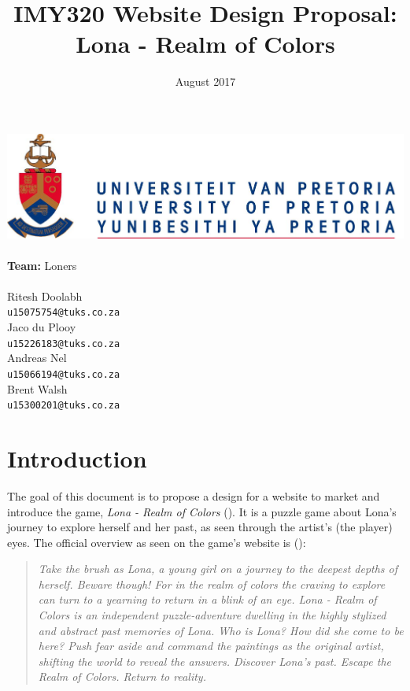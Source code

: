 \documentclass{article}
\title{IMY320 Website Design Proposal: Lona - Realm of Colors}
\date{August 2017}
\begin{document}
\makeatletter
    \begin{titlepage}
        \begin{center}
            \includegraphics[width=0.7\linewidth]{up.png}\\[4ex]
            {\huge \bfseries \@title }\\[2ex]
            {\LARGE \textbf{Team:} Loners}\\[2ex]
            {\LARGE \@date}\\[2ex]
            {\large  Ritesh Doolabh\\ \texttt{u15075754@tuks.co.za}}\\[2ex] 
            {\large  Jaco du Plooy\\ \texttt{u15226183@tuks.co.za}}\\[2ex]
            {\large  Andreas Nel\\ \texttt{u15066194@tuks.co.za}}\\[2ex] 
            {\large  Brent Walsh\\ \texttt{u15300201@tuks.co.za}}\\[2ex]
        \end{center}
        
    \end{titlepage}
\makeatother
\cleardoublepage
\thispagestyle{empty}
\newpage
\tableofcontents
\newpage
\section{Introduction}
The goal of this document is to propose a design for a website to market and introduce the game, \textit{Lona - Realm of Colors} (\cite{lonaweb}). It is a puzzle game about Lona's journey to explore herself and her past, as seen through the artist's (the player) eyes. The official overview as seen on the game's website is (\cite{lonaweb}):
    \begin{quotation}
    \textit{
    Take the brush as Lona, a young girl on a journey to the deepest depths of herself. Beware though! For in the realm of colors the craving to explore can turn to a yearning to return in a blink of an eye.
    Lona - Realm of Colors is an independent puzzle-adventure dwelling in the highly stylized and abstract past memories of Lona.
    Who is Lona? How did she come to be here? Push fear aside and command the paintings as the original artist, shifting the world to reveal the answers. Discover Lona’s past. Escape the Realm of Colors. Return to reality.}
    \end{quotation}
    
\end{document}
